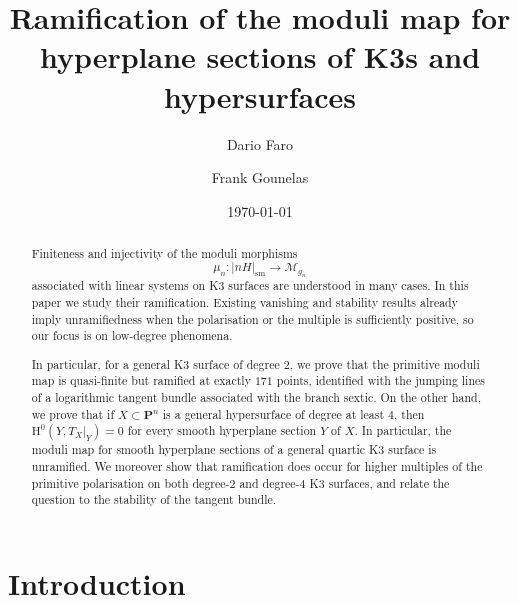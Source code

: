\documentclass[a4paper,12pt,twoside,reqno]{amsart}
\numberwithin{equation}{section}
\theoremstyle{plain}
\theoremstyle{definition}
\newcommand{\PP}{\mathbf{P}}
\newcommand{\sm}{\mathrm{sm}}
\newcommand{\Mmod}{\mathscr{M}}
\newcommand{\HH}{\mathrm{H}}
\theoremstyle{plain}
\theoremstyle{definition}
\begin{document}
\title[Ramification of the moduli map]{Ramification of the moduli map for hyperplane sections of K3s and hypersurfaces}
\author{Dario Faro}
\address{Dipartimento di Matematica ``Federigo Enriques'', Universit\`a degli Studi di Milano, Via Saldini 50, 20133 Milano, Italy}
\author{Frank Gounelas}
\address{Mathematisches Institut, Universit\"at Bonn, Endenicher Allee 60, 53115 Bonn, Germany} 
\date{\today}

\begin{abstract}
Finiteness and injectivity of the moduli morphisms
\[
\mu_n\colon|nH|_{\sm}\longrightarrow\Mmod_{g_n}
\]
associated with linear systems on K3 surfaces are understood in many cases.
In this paper we study their ramification. Existing vanishing and
stability results already imply unramifiedness when the polarisation or the multiple
is sufficiently positive, so our focus is on low-degree phenomena.

In particular, for a general K3 surface of degree $2$, we prove that the primitive moduli map is quasi-finite but ramified at exactly $171$ points, identified with the jumping lines of a logarithmic tangent bundle associated with the branch sextic. On the other hand, we prove that if $X\subset\PP^n$ is a general hypersurface of degree at least $4$, then $\HH^0(Y,T_X|_Y)=0$ for every smooth hyperplane section $Y$ of $X$. In particular, the moduli map for smooth hyperplane sections of a general quartic K3 surface is unramified. 
We moreover show that ramification does occur for higher multiples of the primitive polarisation on both degree-$2$ and degree-$4$ K3 surfaces, and relate the question to the stability of the tangent bundle.
\end{abstract}

\maketitle

\tableofcontents

\section{Introduction}
\end{document}
